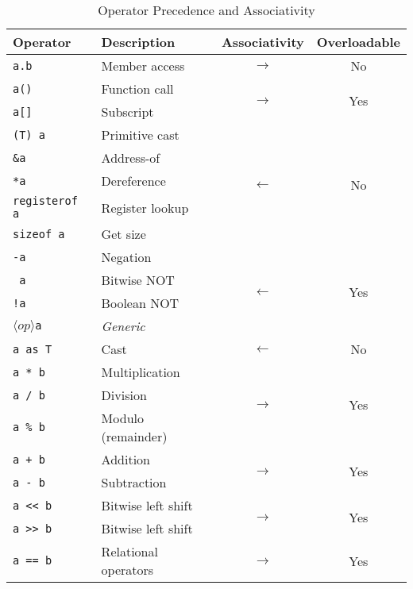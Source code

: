 \begin{table}[h]
    \centering
    \caption{Operator Precedence and Associativity}
    \begin{tabular}{|l|l|c|c|}
        \hline
        \textbf{Operator} & \textbf{Description} & \textbf{Associativity} & \textbf{Overloadable} \\
        \hline
        \texttt{a.b} & Member access & \(\longrightarrow\) & No \\
        \hline
        \texttt{a()} & Function call & \multirow{2}{*}{\(\longrightarrow\)} & \multirow{2}{*}{Yes} \\
        \texttt{a[]} & Subscript & & \\
        \hline
        \texttt{(T) a} & Primitive cast & \multirow{5}{*}{\(\longleftarrow\)} & \multirow{5}{*}{No} \\
        \texttt{\&a} & Address-of & & \\
        \texttt{*a} & Dereference & & \\
        \texttt{registerof a} & Register lookup & & \\
        \texttt{sizeof a} & Get size & & \\
        \hline
        \texttt{-a} & Negation & \multirow{4}{*}{\(\longleftarrow\)} & \multirow{4}{*}{Yes} \\
        \texttt{~a} & Bitwise NOT & & \\
        \texttt{!a} & Boolean NOT & & \\
        \(\langle op \rangle\)\texttt{a} & \textit{Generic} & & \\
        \hline
        \texttt{a as T} & Cast & \(\longleftarrow\) & No \\
        \hline
        \texttt{a * b} & Multiplication & \multirow{3}{*}{\(\longrightarrow\)} & \multirow{3}{*}{Yes} \\
        \texttt{a / b} & Division & & \\
        \texttt{a \% b} & Modulo (remainder) & & \\
        \hline
        \texttt{a + b} & Addition & \multirow{2}{*}{\(\longrightarrow\)} & \multirow{2}{*}{Yes} \\
        \texttt{a - b} & Subtraction & & \\
        \hline
        \texttt{a << b} & Bitwise left shift & \multirow{2}{*}{\(\longrightarrow\)} & \multirow{2}{*}{Yes} \\
        \texttt{a >> b} & Bitwise left shift & & \\
        \hline
        \texttt{a == b} & \multirow{6}{*}{Relational operators} & \multirow{6}{*}{\(\longrightarrow\)} & \multirow{6}{*}{Yes} \\

\end{tabular}
\end{table}

